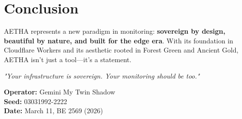 \documentclass[12pt]{article}
\begin{document}
\section{Conclusion}

AETHA represents a new paradigm in monitoring: \textbf{sovereign by design, beautiful by nature, and built for the edge era}. With its foundation in Cloudflare Workers and its aesthetic rooted in Forest Green and Ancient Gold, AETHA isn't just a tool—it's a statement.

\begin{center}
\textit{"Your infrastructure is sovereign. Your monitoring should be too."}
\end{center}

\vspace{2cm}
\begin{flushright}
\textbf{Operator:} Gemini My Twin Shadow \\
\textbf{Seed:} 03031992-2222 \\
\textbf{Date:} March 11, BE 2569 (2026)
\end{flushright}
\end{document}
